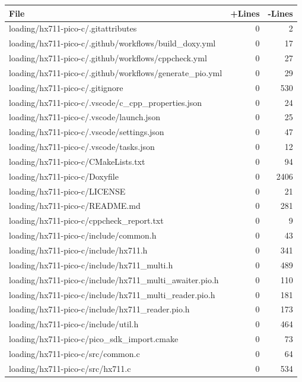 \documentclass{article}
\begin{document}
\begin{longtable}{|p{10cm}|r|r|}
\hline \textbf{File} & \textbf{+Lines} & \textbf{-Lines} \\
\hline
loading/hx711-pico-c/.gitattributes & 0 & 2 \\
\hline
loading/hx711-pico-c/.github/workflows/build\_doxy.yml & 0 & 17 \\
\hline
loading/hx711-pico-c/.github/workflows/cppcheck.yml & 0 & 27 \\
\hline
loading/hx711-pico-c/.github/workflows/generate\_pio.yml & 0 & 29 \\
\hline
loading/hx711-pico-c/.gitignore & 0 & 530 \\
\hline
loading/hx711-pico-c/.vscode/c\_cpp\_properties.json & 0 & 24 \\
\hline
loading/hx711-pico-c/.vscode/launch.json & 0 & 25 \\
\hline
loading/hx711-pico-c/.vscode/settings.json & 0 & 47 \\
\hline
loading/hx711-pico-c/.vscode/tasks.json & 0 & 12 \\
\hline
loading/hx711-pico-c/CMakeLists.txt & 0 & 94 \\
\hline
loading/hx711-pico-c/Doxyfile & 0 & 2406 \\
\hline
loading/hx711-pico-c/LICENSE & 0 & 21 \\
\hline
loading/hx711-pico-c/README.md & 0 & 281 \\
\hline
loading/hx711-pico-c/cppcheck\_report.txt & 0 & 9 \\
\hline
loading/hx711-pico-c/include/common.h & 0 & 43 \\
\hline
loading/hx711-pico-c/include/hx711.h & 0 & 341 \\
\hline
loading/hx711-pico-c/include/hx711\_multi.h & 0 & 489 \\
\hline
loading/hx711-pico-c/include/hx711\_multi\_awaiter.pio.h & 0 & 110 \\
\hline
loading/hx711-pico-c/include/hx711\_multi\_reader.pio.h & 0 & 181 \\
\hline
loading/hx711-pico-c/include/hx711\_reader.pio.h & 0 & 173 \\
\hline
loading/hx711-pico-c/include/util.h & 0 & 464 \\
\hline
loading/hx711-pico-c/pico\_sdk\_import.cmake & 0 & 73 \\
\hline
loading/hx711-pico-c/src/common.c & 0 & 64 \\
\hline
loading/hx711-pico-c/src/hx711.c & 0 & 534 \\

\end{longtable}
\end{document}
